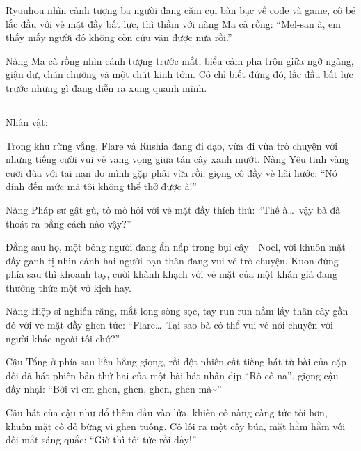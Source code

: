 \documentclass[../main.tex]{subfiles}
\begin{document}
Ryuuhou nhìn cảnh tượng ba người đang cặm cụi bàn bạc về code và game, cô bé lắc đầu với vẻ mặt đầy bất lực, thì thầm với nàng Ma cà rồng: ``Mel-san à, em thấy mấy người đó không còn cứu vãn được nữa rồi.''

Nàng Ma cà rồng nhìn cảnh tượng trước mắt, biểu cảm pha trộn giữa ngỡ ngàng, giận dữ, chán chường và một chút kinh tởm. Cô chỉ biết đứng đó, lắc đầu bất lực trước những gì đang diễn ra xung quanh mình.

\newpage

\subsection*{\label{ep-S13.V}}
\begin{center}
  {\caviar\fontsize{12pt}{12pt}\selectfont Nhân vật:    }
\end{center}

Trong khu rừng vắng, Flare và Rushia đang đi dạo, vừa đi vừa trò chuyện với những tiếng cười vui vẻ vang vọng giữa tán cây xanh mướt. Nàng Yêu tinh vàng cười đùa với tai nạn do mình gặp phải vừa rồi, giọng cô đầy vẻ hài hước: ``Nó dính đến mức mà tôi không thể thở được à!''

Nàng Pháp sư gật gù, tò mò hỏi với vẻ mặt đầy thích thú: ``Thế à\dots\ vậy bà đã thoát ra bằng cách nào vậy?''

Đằng sau họ, một bóng người đang ẩn nấp trong bụi cây - Noel, với khuôn mặt đầy ganh tị nhìn cảnh hai người bạn thân đang vui vẻ trò chuyện. Kuon đứng phía sau thì khoanh tay, cười khành khạch với vẻ mặt của một khán giả đang thưởng thức một vở kịch hay.


Nàng Hiệp sĩ nghiến răng, mắt long sòng sọc, tay run run nắm lấy thân cây gần đó với vẻ mặt đầy ghen tức: ``Flare\dots\ Tại sao bà có thể vui vẻ nói chuyện với người khác ngoài tôi chứ?''

Cậu Tổng ở phía sau liền hắng giọng, rồi đột nhiên cất tiếng hát từ bài của cặp đôi đã hát phiên bản thứ hai của một bài hát nhân dịp ``Rô-cô-na'', giọng cậu đầy nhại: ``Bởi vì em ghen, ghen, ghen, ghen mà\~{}''

Câu hát của cậu như đổ thêm dầu vào lửa, khiến cô nàng càng tức tối hơn, khuôn mặt cô đỏ bừng vì ghen tuông. Cô lôi ra một cây búa, mặt hằm hằm với đôi mắt sáng quắc: ``Giờ thì tôi tức rồi đấy!''
\end{document}
